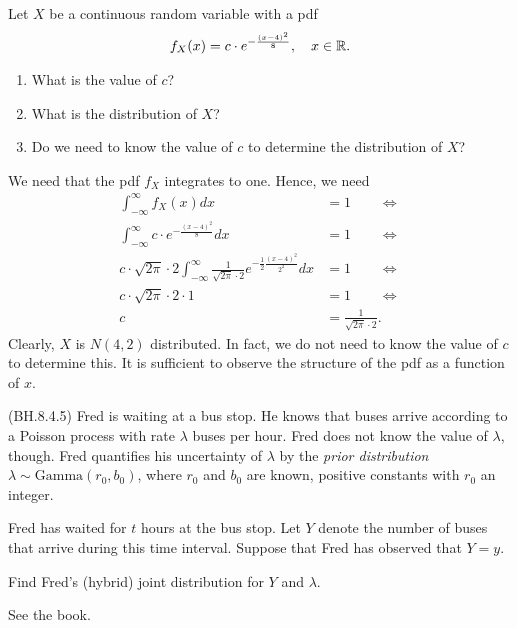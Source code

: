 \documentclass[lectures]{subfiles}
\begin{document}
\begin{exercise}
Let $X$ be a continuous random variable with a pdf
\begin{align}
    f_X(x) = c \cdot e^{-\frac{(x - 4)^2}{8}}, \quad x \in \mathbb{R}.
\end{align}
\begin{enumerate}
    \item What is the value of $c$?
    \item What is the distribution of $X$?
    \item Do we need to know the value of $c$ to determine the distribution of $X$?
\end{enumerate}
\begin{solution}
We need that the pdf $f_X$ integrates to one. Hence, we need
\begin{align}
    \int_{-\infty}^\infty f_X(x) dx &= 1 \qquad \iff \\
    \int_{-\infty}^\infty c \cdot e^{-\frac{(x - 4)^2}{8}} dx &= 1 \qquad \iff \\
    c \cdot \sqrt{2\pi}\cdot 2 \int_{-\infty}^\infty  \frac{1}{\sqrt{2\pi}\cdot 2} e^{-\frac{1}{2}\frac{(x - 4)^2}{2^2}} dx &= 1 \qquad \iff \\
    c \cdot \sqrt{2\pi}\cdot 2 \cdot 1 &= 1 \qquad \iff \\
    c &= \frac{1}{\sqrt{2\pi}\cdot 2}.
\end{align}
Clearly, $X$ is $N(4,2)$ distributed. In fact, we do not need to know the value of $c$ to determine this. It is sufficient to observe the structure of the pdf as a function of $x$.
\end{solution}
\end{exercise}


(BH.8.4.5) Fred is waiting at a bus stop. He knows that buses arrive according to a Poisson process with rate $\lambda$ buses per hour. Fred does not know the value of $\lambda$, though. Fred quantifies his uncertainty of $\lambda$ by the \textit{prior distribution} $\lambda \sim \text{Gamma}(r_0, b_0)$, where $r_0$ and $b_0$ are known, positive constants with $r_0$ an integer.

Fred has waited for $t$ hours at the bus stop. Let $Y$ denote the number of buses that arrive during this time interval. Suppose that Fred has observed that $Y=y$.

\begin{exercise}
Find Fred's (hybrid) joint distribution for $Y$ and $\lambda$.
\begin{solution}
See the book.
\end{solution}
\end{exercise}
\end{document}
